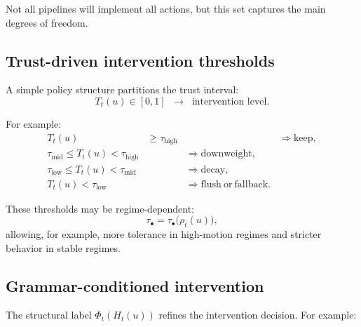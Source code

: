 \documentclass[11pt,letterpaper]{article}
\theoremstyle{gcresult}
\theoremstyle{definition}
\begin{document}
Not all pipelines will implement all actions, but this set captures the main degrees of freedom.


\subsection{Trust-driven intervention thresholds}

A simple policy structure partitions the trust interval:
\begin{equation}
T_t(u)\in[0,1]
\;\;\longrightarrow\;\;
\text{intervention level}.
\end{equation}

For example:
\begin{align}
T_t(u) &\ge \tau_{\mathrm{high}} &&\Rightarrow \mathrm{keep},\\
\tau_{\mathrm{mid}} \le T_t(u) < \tau_{\mathrm{high}} &&\Rightarrow \mathrm{downweight},\\
\tau_{\mathrm{low}} \le T_t(u) < \tau_{\mathrm{mid}} &&\Rightarrow \mathrm{decay},\\
T_t(u) < \tau_{\mathrm{low}} &&\Rightarrow \mathrm{flush\ or\ fallback}.
\end{align}

These thresholds may be regime-dependent:
\begin{equation}
\tau_{\bullet}=\tau_{\bullet}\bigl(\rho_t(u)\bigr),
\end{equation}
allowing, for example, more tolerance in high-motion regimes and stricter behavior in stable regimes.


\subsection{Grammar-conditioned intervention}

The structural label $\Phi_t(H_t(u))$ refines the intervention decision. For example:
\end{document}
